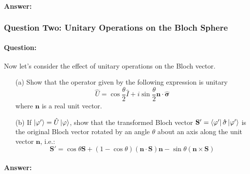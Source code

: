 \documentclass[reprint, amsmath,amssymb, aps]{revtex4-2}
\begin{document}
                \begin{mdframed}
                    \paragraph{Answer:}

                    
                \end{mdframed}
                
            \subsubsection{Question Two: Unitary Operations on the Bloch Sphere}
                \paragraph{Question:}
                
                Now let's consider the effect of unitary operations on the Bloch vector. 
                \begin{itemize}
                    \item[(a)] Show that the operator given by the following expression is unitary
                    \begin{equation*}
                        \hat{U} = \cos{\frac{\theta}{2}}\hat{I} + i\sin{\frac{\theta}{2}}\mathbf{n}\cdot\mathbf{\hat{\sigma}}
                    \end{equation*}
                    where $\mathbf{n}$ is a real unit vector.
                    \item[(b)] If $\ket{\varphi'} = \hat{U}\ket{\varphi}$, show that the transformed Bloch vector $\mathbf{S}' = \bra{\varphi'}\mathbf{\hat{\sigma}}\ket{\varphi'}$ is the original Bloch vector rotated by an angle $\theta$ about an axis along the unit vector $\mathbf{n}$, i.e.:
                    \begin{equation*}
                        \mathbf{S}' = \cos\theta\mathbf{S} + (1-\cos\theta)(\mathbf{n}\cdot\mathbf{S})\mathbf{n}-\sin\theta(\mathbf{n}\times\mathbf{S})
                    \end{equation*}
                \end{itemize}

                \begin{mdframed}
                    \paragraph{Answer:}

                    
                \end{mdframed}
\end{document}
